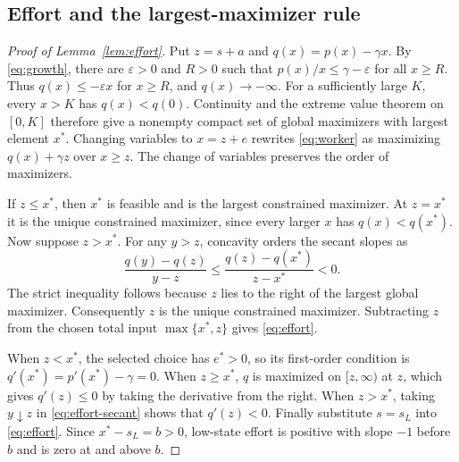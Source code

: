 \documentclass[11pt]{article}
\theoremstyle{definition}
\begin{document}
\subsection{Effort and the largest-maximizer rule}\label{app:effort}
\begin{proof}[Proof of Lemma~\ref{lem:effort}]
Put $z=s+a$ and $q(x)=p(x)-\gamma x$. By \eqref{eq:growth}, there are
$\varepsilon>0$ and $R>0$ such that $p(x)/x\leq\gamma-\varepsilon$
for all $x\geq R$. Thus $q(x)\leq-\varepsilon x$ for $x\geq R$, and
$q(x)\to-\infty$. For a sufficiently large $K$, every $x>K$ has
$q(x)<q(0)$. Continuity and the extreme value theorem on $[0,K]$
therefore give a nonempty compact set of global maximizers with largest
element $x^*$. Changing variables to $x=z+e$ rewrites \eqref{eq:worker}
as maximizing $q(x)+\gamma z$ over $x\geq z$. The change of variables
preserves the order of maximizers.

If $z\leq x^*$, then $x^*$ is feasible and is the largest constrained
maximizer. At $z=x^*$ it is the unique constrained maximizer, since every
larger $x$ has $q(x)<q(x^*)$. Now suppose $z>x^*$. For any $y>z$, concavity
orders the secant slopes as
\begin{equation}\label{eq:effort-secant}
 \frac{q(y)-q(z)}{y-z}\leq
 \frac{q(z)-q(x^*)}{z-x^*}<0 .
\end{equation}
The strict inequality follows because $z$ lies to the right of the
largest global maximizer. Consequently $z$ is the unique constrained
maximizer. Subtracting $z$ from the chosen total input
$\max\{x^*,z\}$ gives \eqref{eq:effort}.

When $z<x^*$, the selected choice has $e^*>0$, so its first-order
condition is $q'(x^*)=p'(x^*)-\gamma=0$. When $z\geq x^*$, $q$ is
maximized on $[z,\infty)$ at $z$, which gives $q'(z)\leq0$ by taking
the derivative from the right. When $z>x^*$, taking $y\downarrow z$
in \eqref{eq:effort-secant} shows that $q'(z)<0$. Finally substitute $s=s_L$ into
\eqref{eq:effort}. Since $x^*-s_L=b>0$, low-state effort is positive
with slope $-1$ before $b$ and is zero at and above $b$.
\end{proof}
\end{document}

